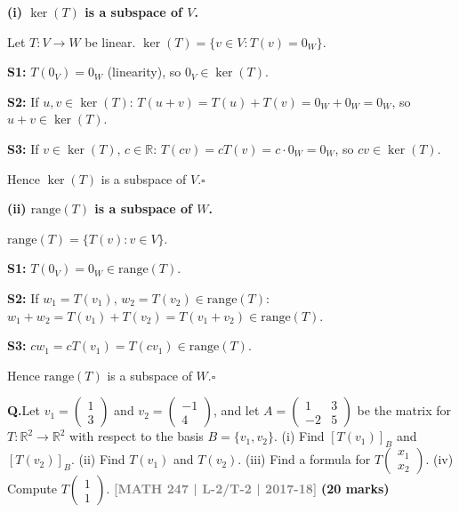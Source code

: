 \documentclass[12pt,a3paper]{article}
\newcommand{\yr}[1]{\hfill\textcolor{gray}{\small\textbf{[#1]}}}
\newcommand{\mk}[1]{\textcolor{orange!70!black}{\small\textbf{(#1 marks)}}}
\newcounter{qnum}
\newcommand{\Q}[1]{%
  \needspace{4\baselineskip}
  \refstepcounter{qnum}
  \vspace{6pt}
  \noindent\textbf{Q\theqnum.}\enspace #1\par
}
\begin{document}
\begin{tcolorbox}[enhanced,breakable,colback=cF!4,colframe=cF,
  boxrule=0.8pt,arc=5pt,
  title={\textbf{Answer --- Kernel and Range of $T$ are Subspaces}},
  fonttitle=\bfseries\color{white},colbacktitle=cF]

\textbf{(i) $\ker(T)$ is a subspace of $V$.}

Let $T:V\to W$ be linear. $\ker(T)=\{v\in V: T(v)=0_W\}$.

\textbf{S1:} $T(0_V)=0_W$ (linearity), so $0_V\in\ker(T)$.\;\checkmark

\textbf{S2:} If $u,v\in\ker(T)$: $T(u+v)=T(u)+T(v)=0_W+0_W=0_W$, so $u+v\in\ker(T)$.\;\checkmark

\textbf{S3:} If $v\in\ker(T)$, $c\in\mathbb{R}$: $T(cv)=cT(v)=c\cdot0_W=0_W$, so $cv\in\ker(T)$.\;\checkmark

Hence $\ker(T)$ is a subspace of $V$.\hfill$\square$

\medskip
\textbf{(ii) $\mathrm{range}(T)$ is a subspace of $W$.}

$\mathrm{range}(T)=\{T(v):v\in V\}$.

\textbf{S1:} $T(0_V)=0_W\in\mathrm{range}(T)$.\;\checkmark

\textbf{S2:} If $w_1=T(v_1),\,w_2=T(v_2)\in\mathrm{range}(T)$: $w_1+w_2=T(v_1)+T(v_2)=T(v_1+v_2)\in\mathrm{range}(T)$.\;\checkmark

\textbf{S3:} $cw_1=cT(v_1)=T(cv_1)\in\mathrm{range}(T)$.\;\checkmark

Hence $\mathrm{range}(T)$ is a subspace of $W$.\hfill$\square$

\end{tcolorbox}

\Q{Let $v_1 = \begin{pmatrix} 1 \\ 3 \end{pmatrix}$ and $v_2 = \begin{pmatrix} -1 \\ 4 \end{pmatrix}$, and let $A = \begin{pmatrix} 1 & 3 \\ -2 & 5 \end{pmatrix}$ be the matrix for $T: \mathbb{R}^2 \to \mathbb{R}^2$ with respect to the basis $B = \{v_1, v_2\}$. (i) Find $[T(v_1)]_B$ and $[T(v_2)]_B$. (ii) Find $T(v_1)$ and $T(v_2)$. (iii) Find a formula for $T\begin{pmatrix} x_1 \\ x_2 \end{pmatrix}$. (iv) Compute $T\begin{pmatrix} 1 \\ 1 \end{pmatrix}$.
\yr{MATH 247 | L-2/T-2 | 2017-18} \mk{20}}
\end{document}
